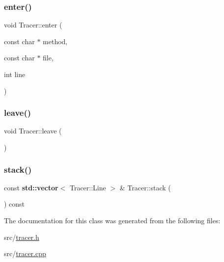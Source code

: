 \mbox{\label{class_tracer_a40c10b5b975b5bb6460a4e562dc32de4}} 
\subsubsection{\texorpdfstring{enter()}{enter()}}
{\footnotesize\ttfamily void Tracer\+::enter (\begin{DoxyParamCaption}\item[{const char $\ast$}]{method,  }\item[{const char $\ast$}]{file,  }\item[{int}]{line }\end{DoxyParamCaption})}

\mbox{\label{class_tracer_a436f4f1c904d748c93be33966f8a40ed}} 
\subsubsection{\texorpdfstring{leave()}{leave()}}
{\footnotesize\ttfamily void Tracer\+::leave (\begin{DoxyParamCaption}{ }\end{DoxyParamCaption})}

\mbox{\label{class_tracer_afaaf6df2d767ee945262c0a660cd77a9}} 
\subsubsection{\texorpdfstring{stack()}{stack()}}
{\footnotesize\ttfamily const \textbf{ std\+::vector}$<$ Tracer\+::\+Line $>$ \& Tracer\+::stack (\begin{DoxyParamCaption}{ }\end{DoxyParamCaption}) const}



The documentation for this class was generated from the following files\+:\begin{DoxyCompactItemize}
\item 
src/\hyperlink{tracer_8h}{tracer.\+h}\item 
src/\hyperlink{tracer_8cpp}{tracer.\+cpp}\end{DoxyCompactItemize}
